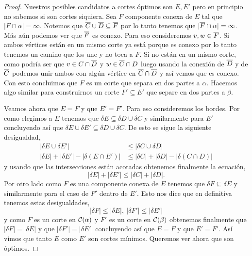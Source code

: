 \documentclass[tesis.tex]{subfiles}
\begin{document}
\begin{proof}
	Nuestros posibles candidatos a cortes óptimos son $E,E'$ pero en principio no sabemos si son cortes siquiera.
	Sea $F$ componente conexa de $E$ tal que $|F \cap \alpha| = \infty$.
	Notemos que $\overline C \cup \overline D \subseteq \overline F$ por lo tanto tenemos que $|\overline F \cap \alpha|=\infty$.
	Más aún podemos ver que $\overline F$ es conexo.
	Para eso consideremos $v,w \in \overline F$.
	Si ambos vértices están en un mismo corte ya está porque es conexo por lo tanto tenemos un camino que los une y no toca a $F$.
	Si no están en un mismo corte, como podría ser que $v \in C \cap \overline D$ y $w \in \overline C \cap D$ luego usando la conexión de $\overline D$ y de $\overline C$ podemos unir ambos con algún vértice en $\overline C \cap \overline D$ y así vemos que es conexo.
	Con esto concluimos que $F$ es un corte que separa en dos partes a $\alpha$.
	Hacemos algo similar para construirnos un corte $F' \subseteq E'$ que separe en dos partes a $\beta$.
	
	Veamos ahora que $E=F$ y que $E' = F'$.
	Para eso consideremos los bordes. 
	Por como elegimos a $E$ tenemos que $\delta E \subseteq \delta D \cup \delta C$ y similarmente para $E'$ concluyendo así que $\delta E \cup \delta E' \subseteq \delta D \cup \delta C$.
	De esto se sigue la siguiente desigualdad,
	\begin{align*}
		|\delta E \cup \delta E'| & \le |\delta C \cup \delta D| \\
		|\delta E| + |\delta E'| - |\delta (E \cap E')| & \le |\delta C| + |\delta D| - |\delta (C \cap D)|
	\end{align*}
	y usando que las intersecciones están acotadas obtenemos finalmente la ecuación,
	\[
		|\delta E| + |\delta E'| \le |\delta C| + |\delta D|.
	\]
	Por otro lado como $F$ es una componente conexa de $E$ tenemos que $\delta F \subseteq \delta E$ y similarmente para el caso de $F'$ dentro de $E'$.
	Esto nos dice que en definitiva tenemos estas desigualdades,
	\[
		|\delta F| \le  |\delta E|, \ |\delta F'| \le |\delta E'| 
	\]
	y como $F$ es un corte en ${\cal C}(\alpha)$ y $F'$ es un corte en ${\cal C}(\beta)$ obtenemos finalmente que $|\delta F| = |\delta E|$ y que $|\delta F'| = |\delta E'|$ concluyendo así que $E=F$ y que $E'=F'$.
	Así vimos que tanto $E$ como $E'$ son cortes mínimos.
	Queremos ver ahora que son óptimos.
	

\end{proof}
\end{document}
